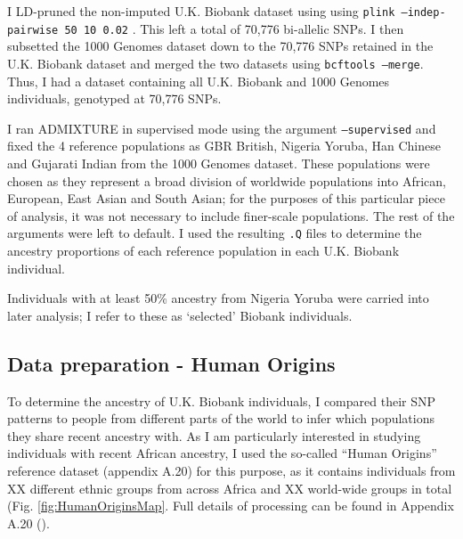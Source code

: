 {I LD-pruned the non-imputed U.K. Biobank dataset using using \texttt{plink --indep-pairwise 50 10 0.02} \cite{purcell2007plink}. This left a total of 70,776 bi-allelic SNPs. I then subsetted the 1000 Genomes dataset down to the 70,776 SNPs retained in the U.K. Biobank dataset and merged the two datasets using \texttt{bcftools --merge}. Thus, I had a dataset containing all U.K. Biobank and 1000 Genomes individuals, genotyped at 70,776 SNPs.

I ran ADMIXTURE in supervised mode using the argument \texttt{--supervised} and fixed the 4 reference populations as GBR British, Nigeria Yoruba, Han Chinese and Gujarati Indian from the 1000 Genomes dataset. These populations were chosen as they represent a broad division of worldwide populations into African, European, East Asian and South Asian; for the purposes of this particular piece of analysis, it was not necessary to include finer-scale populations. The rest of the arguments were left to default. I used the resulting \texttt{.Q} files to determine the ancestry proportions of each reference population in each U.K. Biobank individual. 

Individuals with at least 50\% ancestry from Nigeria Yoruba were carried into later analysis; I refer to these as `selected' Biobank individuals.

\subsection{Data preparation - Human Origins}

To determine the ancestry of U.K. Biobank individuals, I compared their SNP patterns to people from different parts of the world to infer which populations they share recent ancestry with. As I am particularly interested in studying individuals with recent African ancestry, I used the so-called ``Human Origins'' reference dataset (appendix A.20) for this purpose, as it contains individuals from XX different ethnic groups from across Africa and XX world-wide groups in total (Fig. \ref{fig:HumanOriginsMap}. Full details of processing can be found in Appendix A.20 ().

}
